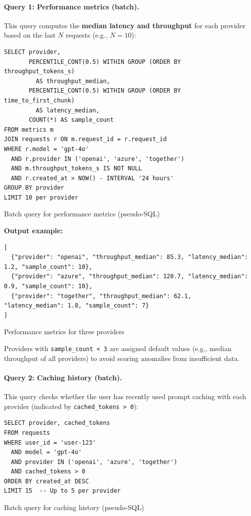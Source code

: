 \documentclass[english]{article}
\begin{document}
\paragraph{Query 1: Performance metrics (batch).}

This query computes the \textbf{median latency and throughput} for each provider based on the last $N$ requests (e.g., $N=10$):

\begin{listing}[H]
\begin{verbatim}
SELECT provider,
       PERCENTILE_CONT(0.5) WITHIN GROUP (ORDER BY throughput_tokens_s)
         AS throughput_median,
       PERCENTILE_CONT(0.5) WITHIN GROUP (ORDER BY time_to_first_chunk)
         AS latency_median,
       COUNT(*) AS sample_count
FROM metrics m
JOIN requests r ON m.request_id = r.request_id
WHERE r.model = 'gpt-4o'
  AND r.provider IN ('openai', 'azure', 'together')
  AND m.throughput_tokens_s IS NOT NULL
  AND r.created_at > NOW() - INTERVAL '24 hours'
GROUP BY provider
LIMIT 10 per provider
\end{verbatim}
\caption{Batch query for performance metrics (pseudo-SQL)}
\end{listing}

\textbf{Output example:}
\begin{listing}[H]
\begin{verbatim}
[
  {"provider": "openai", "throughput_median": 85.3, "latency_median": 1.2, "sample_count": 10},
  {"provider": "azure", "throughput_median": 120.7, "latency_median": 0.9, "sample_count": 10},
  {"provider": "together", "throughput_median": 62.1, "latency_median": 1.8, "sample_count": 7}
]
\end{verbatim}
\caption{Performance metrics for three providers}
\end{listing}

Providers with \texttt{sample\_count < 3} are assigned default values (e.g., median throughput of all providers) to avoid scoring anomalies from insufficient data.

\paragraph{Query 2: Caching history (batch).}

This query checks whether the user has recently used prompt caching with each provider (indicated by \texttt{cached\_tokens > 0}):

\begin{listing}[H]
\begin{verbatim}
SELECT provider, cached_tokens
FROM requests
WHERE user_id = 'user-123'
  AND model = 'gpt-4o'
  AND provider IN ('openai', 'azure', 'together')
  AND cached_tokens > 0
ORDER BY created_at DESC
LIMIT 15  -- Up to 5 per provider
\end{verbatim}
\caption{Batch query for caching history (pseudo-SQL)}
\end{listing}
\end{document}
